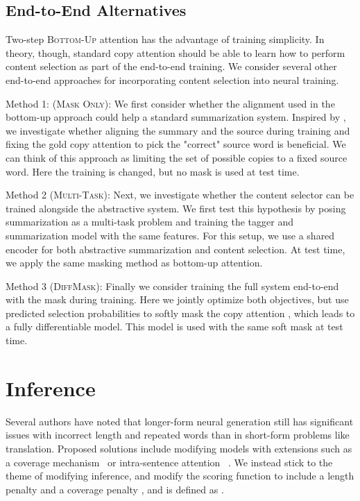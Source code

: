 \documentclass[11pt,a4paper]{article}
\begin{document}
\subsection{End-to-End Alternatives}

Two-step \textsc{Bottom-Up} attention has the advantage of training simplicity. In theory, though, standard copy attention should be able to learn how to perform content selection as part of the end-to-end training. We consider several other end-to-end approaches for incorporating content selection into neural training.





Method 1: (\textsc{Mask Only}): We first consider whether the alignment used in the bottom-up approach could help a standard summarization system. Inspired by \citet{nallapati2017summarunner}, we investigate whether aligning the summary and the source during training and fixing the gold copy attention to pick the "correct" source word is beneficial. We can think of this approach as limiting the set of possible copies to a fixed source word. Here the training is changed, but no mask is used at test time.



Method 2 (\textsc{Multi-Task}): Next, we investigate whether the content selector can be trained alongside the abstractive system. We first test this hypothesis by posing summarization as a multi-task problem and training the tagger and summarization model with the same features. For this setup, we use a shared encoder for both abstractive summarization and content selection. At test time, we apply the same masking method as bottom-up attention. 

Method 3 (\textsc{DiffMask}): Finally we consider training the full system end-to-end with the mask during training. Here we jointly optimize both objectives, but use predicted selection probabilities to softly mask the copy attention , which leads to a fully differentiable model. This model is used with the same soft mask at test time. 











\section{Inference}

Several authors have noted that longer-form neural generation still has significant issues with incorrect length and repeated words than in short-form problems like translation. Proposed solutions include modifying models with extensions such as a coverage mechanism~\citep{tu2016modeling,see2017get} or intra-sentence attention~ \citep{cheng2016long,paulus2017deep}. We instead stick to the theme of modifying inference, and modify the scoring function to include a length penalty  and a coverage penalty , and is defined as .
\end{document}
